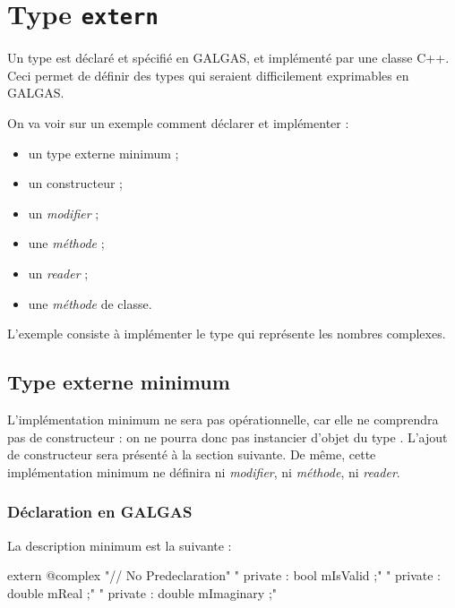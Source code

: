 
\chapter{Type \texttt{extern}}


Un type  est déclaré et spécifié en GALGAS, et implémenté par une classe C++. Ceci permet de définir des types qui seraient difficilement exprimables en GALGAS.

On va voir sur un exemple comment déclarer et implémenter :
\begin{itemize}
  \item un type externe minimum ;
  \item un constructeur ;
  \item un \emph{modifier} ;
  \item une \emph{méthode} ;
  \item un \emph{reader} ;
  \item une \emph{méthode} de classe.
\end{itemize}

L'exemple consiste à implémenter le type  qui représente les nombres complexes.

\section{Type externe minimum}

L'implémentation minimum ne sera pas opérationnelle, car elle ne comprendra pas de constructeur : on ne pourra donc pas instancier d'objet du type . L'ajout de constructeur sera présenté à la section suivante. De même, cette implémentation minimum ne définira ni \emph{modifier}, ni \emph{méthode}, ni \emph{reader}.


\subsection{Déclaration en GALGAS}

La description minimum est la suivante :
\begin{galgascode}
extern @complex {
  "// No Predeclaration\n"
}{
  "  private : bool mIsValid ;\n"
  "  private : double mReal ;\n"
  "  private : double mImaginary ;\n"
}{
}
\end{galgascode}


